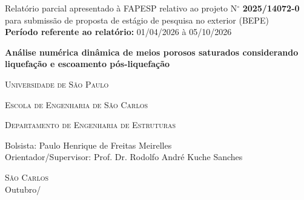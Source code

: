 \documentclass[a4paper,12pt,oneside,brazil,sumario=tradicional]{abntex2}
\begin{document}

\thispagestyle{empty}
\setcounter{page}{1}
\begin{center}
	Relatório parcial apresentado à FAPESP relativo ao projeto N$^{\circ}$ \textbf{2025/14072-0} para submissão de proposta de estágio de pesquisa no exterior (BEPE)\\
	\textbf{Período referente ao relatório:} 01/04/2026 à 05/10/2026
\end{center}

\vspace{2cm}

\begin{center}
	\large\textbf{Análise numérica dinâmica de meios porosos saturados considerando liquefação e escoamento pós-liquefação}
\end{center}

\vspace{2cm}

\begin{center}

	\large\textsc{Universidade de São Paulo}

	\large\textsc{Escola de Engenharia de São Carlos}

	\large\textsc{Departamento de Engenharia de Estruturas}

\end{center}

\vspace{2.cm}

\begin{center}
Bolsista: Paulo Henrique de Freitas Meirelles\\
Orientador/Supervisor: Prof. Dr. Rodolfo André Kuche Sanches
\end{center}

\vfill

\begin{center}
	\textsc{São Carlos}\\
	Outubro/\the\year
\end{center}


%
%


\newpage
\tableofcontents*
\thispagestyle{empty} %
\end{document}

